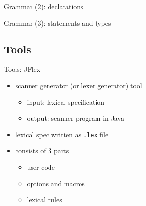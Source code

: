 \documentclass{beamer}
\begin{document}
\begin{frame}[label={sec:orgacab7e0},plain]{Grammar (2): declarations}


\end{frame}




\begin{frame}[label={sec:org310ecb8},plain]{Grammar (3): statements and types}


\end{frame}




\subsection{Tools}
\label{sec:org8f4f4ea}

\begin{frame}[label={sec:org0e661a7},fragile]{Tools: JFlex}
 \begin{itemize}
\item scanner generator (or lexer generator) tool

\begin{itemize}
\item \alert{input}: lexical specification
\item \alert{output}: scanner program in Java
\end{itemize}

\item lexical spec written as \texttt{.lex} file

\item consists of \alert{3 parts}

\begin{itemize}
\item user code
\item options and macros
\item lexical rules
\end{itemize}
\end{itemize}
\end{frame}
\end{document}
